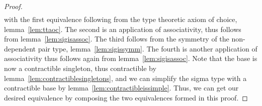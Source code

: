 \documentclass[main.tex]{subfiles}
\begin{document}
\begin{proof}
\begin{align*}
    \end{align*}
    with the first equivalence following from the type theoretic axiom of choice, lemma~\cref{lem:ttaoc}. The second is an application of associativity, thus follows from
    lemma~\cref{lem:sigisassoc}. The third follows from the symmetry of the non-dependent pair type, lemma~\cref{lem:sigissymm}. The fourth is another application of associativity thus follows again from
    lemma~\cref{lem:sigisassoc}. Note that the base is now a contractible singleton, thus contractible by lemma~\cref{lem:contractiblesingletons}, and we can simplify the sigma type with a contractible base by lemma~\cref{lem:contractibleissimple}.
     Thus, we can get our desired equivalence by composing the two equivalences formed in this proof.
    \end{proof}
\end{document}
